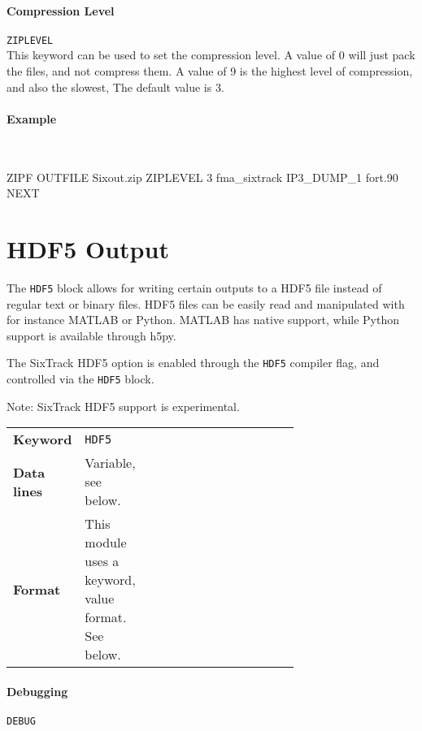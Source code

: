 \paragraph{Compression Level} \texttt{ZIPLEVEL}\\

This keyword can be used to set the compression level.
A value of 0 will just pack the files, and not compress them.
A value of 9 is the highest level of compression, and also the slowest,
The default value is 3.

\paragraph{Example}~
\begin{cverbatim}
ZIPF
    OUTFILE Sixout.zip
    ZIPLEVEL 3
    fma_sixtrack IP3_DUMP_1 fort.90
NEXT
\end{cverbatim}

\section{HDF5 Output} \label{sec:HDF5}

The \texttt{HDF5} block allows for writing certain outputs to a HDF5 file instead of regular text or binary files.
HDF5 files can be easily read and manipulated with for instance MATLAB or Python.
MATLAB has native support, while Python support is available through h5py.

The SixTrack HDF5 option is enabled through the \texttt{HDF5} compiler flag, and controlled via the \texttt{HDF5} block.

\bigskip
\noindent Note: SixTrack HDF5 support is experimental.

\bigskip
\begin{tabular}{@{}llp{0.7\linewidth}}
    \textbf{Keyword}    & \texttt{HDF5} \\
    \textbf{Data lines} & Variable, see below. \\
    \textbf{Format}     & This module uses a keyword, value format. See below.
\end{tabular}

\bigskip

\paragraph{Debugging} \texttt{DEBUG}\\

